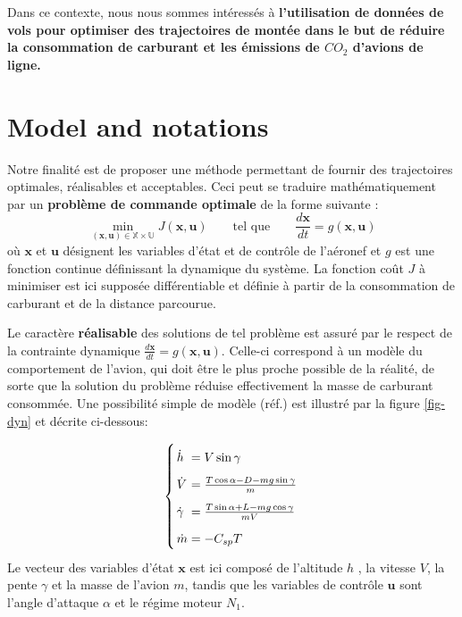\documentclass[a0,portrait]{a0poster}
\begin{document}
\begin{multicols}{2}
Dans ce contexte, nous nous sommes intéressés à \textbf{l'utilisation de données de vols pour optimiser des trajectoires de montée dans le but de réduire la consommation de carburant et les émissions de $CO_2$ d'avions de ligne.}


\color{DarkSlateGray} %
\section{Model and notations}

Notre finalité est de proposer une méthode permettant de fournir des trajectoires optimales, réalisables et acceptables. Ceci peut se traduire mathématiquement par un \textbf{problème de commande optimale} de la forme suivante :
\begin{equation}
\min_{(\bm{x,u}) \in \mathbb{X} \times \mathbb{U}} J(\bm{x,u})  \qquad       \textrm{tel que} \qquad \frac{d \bm{x} }{dt}=g(\bm{x,u})
\end{equation}
où $\bm{x}$ et $\bm{u}$ désignent les variables d'état et de contrôle de l'aéronef et $g$ est une fonction continue définissant la dynamique du système. La fonction coût $J$ à minimiser est ici supposée différentiable et définie à partir de la consommation de carburant et de la distance parcourue.


Le caractère \textbf{réalisable} des solutions de tel problème est assuré par le respect de la contrainte dynamique $\frac{d \bm{x} }{dt}=g(\bm{x,u})$. Celle-ci correspond à un modèle du comportement de l'avion, qui doit être le plus proche possible de la réalité, de sorte que la solution du problème réduise effectivement la masse de carburant consommée. Une possibilité simple de modèle (réf.\cite{hull}) est illustré par la figure \ref{fig-dyn} et décrite ci-dessous:

\begin{align} \label{eq-sys}
\arraycolsep=1.4pt\def\arraystretch{1.8}
\left\{ 
\begin{array}{ll}
\dot{h} &=  V \sin \gamma \\
\dot{V} &=  \frac{T \cos \alpha - D - mg \sin \gamma}{m}\\
\dot{\gamma} &= \frac{T \sin \alpha + L- mg \cos \gamma}{mV}\\
\dot{m} &= -C_{sp} T
\end{array} \right.
\end{align}
Le vecteur des variables d'état $\bm{x}$ est ici composé de l'altitude $h$ , la vitesse $V$, la pente $\gamma$ et la masse de l'avion $m$, tandis que les variables de contrôle $\bm{u}$ sont l'angle d'attaque $\alpha$ et le régime moteur $N_1$.
\newline


\end{multicols}
\end{document}
